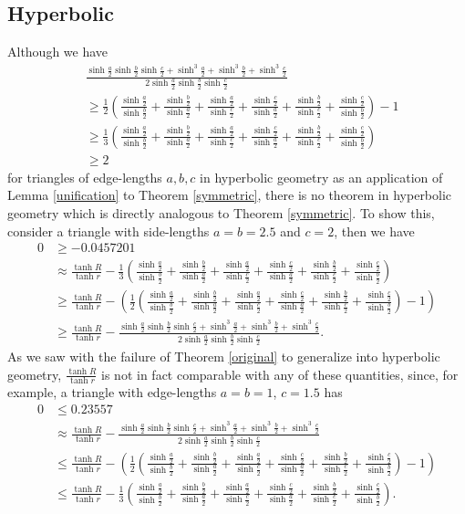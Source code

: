 \documentclass[12pt,notitlepage]{amsart}%
\newcommand{\sh}[1]{\sinh \frac{#1}{2}}
\newcommand{\fracsymh}{\frac{\sh{a}}{\sh{b}}+\frac{\sh{b}}{\sh{a}}+\frac{\sh{a}}{\sh{c}}+\frac{\sh{c}}{\sh{a}}+\frac{\sh{b}}{\sh{c}}+\frac{\sh{c}}{\sh{b}}}
\begin{document}
\subsection{Hyperbolic}
Although we have
\begin{align*}
	&\frac{\sh{a}\sh{b}\sh{c}+\sinh^3\frac{a}{2}+\sinh^3\frac{b}{2}+\sinh^3\frac{c}{2}}{2\sh{a}\sh{b}\sh{c}}\\
    &\geq \frac{1}{2}\left( \fracsymh\right) -1\\
	&\geq \frac{1}{3}\left( \fracsymh\right)\\
	&\geq 2
\end{align*}
for triangles of edge-lengths $a,b,c$ in hyperbolic geometry as an application of Lemma \ref{unification} to Theorem \ref{symmetric}, there is no theorem in hyperbolic geometry which is directly analogous to Theorem \ref{symmetric}.
To show this, consider a triangle with side-lengths $a = b = 2.5$ and $c = 2$, then we have
\begin{align*}
 0&\geq-0.0457201\\ 
 &\approx \frac{\tanh{R}}{\tanh{r}} - \frac{1}{3} \left(\fracsymh \right) \\
 &\geq \frac{\tanh{R}}{\tanh{r}}-\left( \frac{1}{2}(\fracsymh)-1\right)\\
 &\geq \frac{\tanh{R}}{\tanh{r}}-\frac{\sh{a}\sh{b}\sh{c}+\sinh^3\frac{a}{2}+\sinh^3\frac{b}{2}+\sinh^3\frac{c}{2}}{2\sh{a}\sh{b}\sh{c}}.
\end{align*}
As we saw with the failure of Theorem \ref{original} to generalize into hyperbolic geometry, $\frac{\tanh R}{\tanh r}$ is not in fact comparable with any of these quantities, since, for example, a triangle with edge-lengths $a=b=1$, $c=1.5$ has
\begin{align*}
	0&\leq0.23557\\
	&\approx\frac{\tanh R}{\tanh r}-\frac{\sh{a}\sh{b}\sh{c}+\sinh^3\frac{a}{2}+\sinh^3\frac{b}{2}+\sinh^3\frac{c}{2}}{2\sh{a}\sh{b}\sh{c}}\\
    &\leq\frac{\tanh{R}}{\tanh{r}}-\left( \frac{1}{2}(\fracsymh)-1\right)\\
    &\leq\frac{\tanh{R}}{\tanh{r}} - \frac{1}{3} \left(\fracsymh \right).
\end{align*}

\newpage


\end{document}
